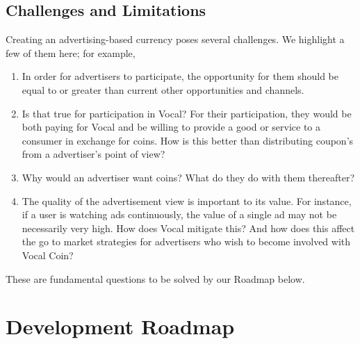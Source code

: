 \documentclass[conference]{IEEEtran}
\begin{document}


    \subsection{Challenges and Limitations}

    Creating an advertising-based currency poses several challenges. We highlight a few of them here; for example,

    \begin{enumerate}
      \item In order for advertisers to participate, the opportunity for them should be equal to or greater than current other opportunities and channels. 
      \item Is that true for participation in Vocal? For their participation, they would be both paying for Vocal and be willing to provide a good or service to a consumer in exchange for coins. How is this better than distributing coupon’s from a advertiser’s point of view?
      \item Why would an advertiser want coins? What do they do with them thereafter?
      \item The quality of the advertisement view is important to its value. For instance, if a user is watching ads continuously, the value of a single ad may not be necessarily very high. How does Vocal mitigate this? And how does this affect the go to market strategies for advertisers who wish to become involved with Vocal Coin?
    \end{enumerate}

    These are fundamental questions to be solved by our Roadmap below.
    
    \section{Development Roadmap}

\end{document}
